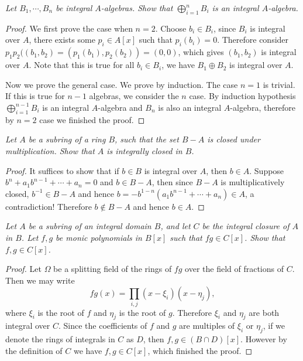 \begin{problem}\em
Let $B_1,\cdots,B_n$ be integral $A$-algebras. Show that $\bigoplus_{i=1}^nB_i$ is an integral $A$-algebra.
\end{problem}
\begin{proof}
We first prove the case when $n=2$. Choose $b_i\in B_i$, since $B_i$ is integral over $A$, there exists some $p_i\in A[x]$ such that $p_i(b_i)=0$. Therefore consider $p_1p_2((b_1,b_2)=(p_1(b_1),p_2(b_2))=(0,0)$, which gives $(b_1,b_2)$ is integral over $A$. Note that this is true for all $b_i\in B_i$, we have $B_1\oplus B_2$ is integral over $A$.\par
Now we prove the general case. We prove by induction. The case $n=1$ is trivial. If this is true for $n-1$ algebras, we consider the $n$ case. By induction hypothesis $\bigoplus_{i=1}^{n-1}B_i$ is an integral $A$-algebra and $B_n$ is also an integral $A$-algebra, therefore by $n=2$ case we finished the proof.
\end{proof}
\begin{problem}\em
Let $A$ be a subring of a ring $B$, such that the set $B-A$ is closed under multiplication. Show that $A$ is integrally closed in $B$.
\end{problem}
\begin{proof}
It suffices to show that if $b\in B$ is integral over $A$, then $b\in A$. Suppose $b^n+a_1b^{n-1}+\cdots+a_n=0$ and $b\in B-A$, then since $B-A$ is multiplicatively closed, $b^{-1}\in B-A$ and hence $b=-b^{1-n}(a_1b^{n-1}+\cdots+a_n)\in A$, a contradiction! Therefore $b\notin B-A$ and hence $b\in A$.
\end{proof}
\begin{problem}\em
Let $A$ be a subring of an integral domain $B$, and let $C$ be the integral closure of $A$ in $B$. Let $f,g$ be monic polynomials in $B[x]$ such that $fg\in C[x]$. Show that $f,g\in C[x]$.
\end{problem}
\begin{proof}
Let $\Omega$ be a splitting field of the rings of $fg$ over the field of fractions of $C$. Then we may write 
$$
fg\left( x \right) =\prod_{i,j}{\left( x-\xi _i \right) \left( x-\eta _j \right)},
$$
where $\xi_i$ is the root of $f$ and $\eta_j$ is the root of $g$. Therefore $\xi_i$ and $\eta_j$ are both integral over $C$. Since the coefficients of $f$ and $g$ are multiples of $\xi_i$ or $\eta_j$, if we denote the rings of integrals in $C$ as $D$, then $f,g\in (B\cap D)[x]$. However by the definition of $C$ we have $f,g\in C[x]$, which finished the proof.
\end{proof}
